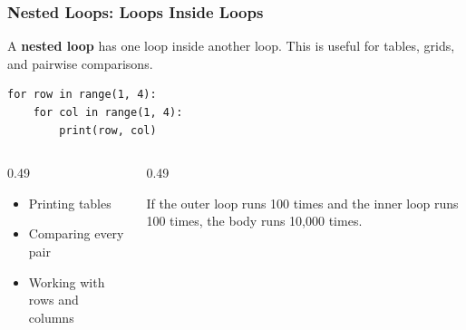 \documentclass[aspectratio=169,10pt]{beamer}
\newcommand{\keyword}[1]{\textcolor{PrimaryBlue}{\textbf{#1}}}
\begin{document}
\begin{frame}[fragile]
\frametitle{Nested Loops: Loops Inside Loops}
A \keyword{nested loop} has one loop inside another loop. This is useful for tables, grids, and pairwise comparisons.

\begin{lstlisting}[style=pycode]
for row in range(1, 4):
    for col in range(1, 4):
        print(row, col)
\end{lstlisting}

\begin{columns}[T,totalwidth=\textwidth]
\begin{column}{0.49\textwidth}
\begin{tcolorbox}[lecturebox,title=Use cases]
\small
\begin{itemize}\setlength\itemsep{0.02cm}
  \item Printing tables
  \item Comparing every pair
  \item Working with rows and columns
\end{itemize}
\end{tcolorbox}
\end{column}
\begin{column}{0.49\textwidth}
\begin{tcolorbox}[lecturebox,title=Performance awareness]
If the outer loop runs 100 times and the inner loop runs 100 times, the body runs 10,000 times.
\end{tcolorbox}
\end{column}
\end{columns}
\end{frame}
\end{document}

